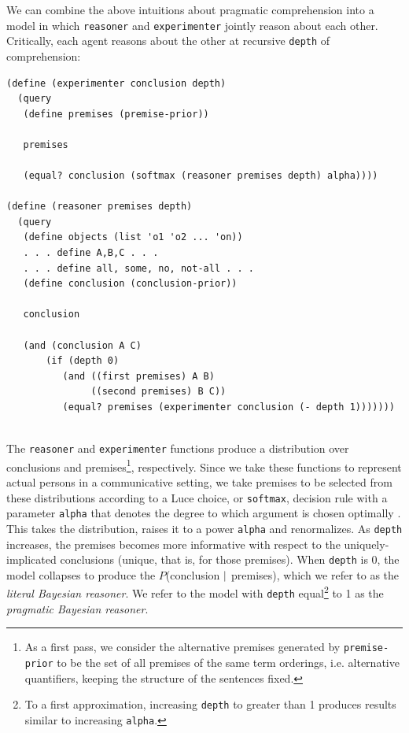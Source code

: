 \documentclass[10pt,letterpaper]{article}
\begin{document}
We can combine the above intuitions about pragmatic comprehension into a model in which \lstinline{reasoner} and \lstinline{experimenter} jointly reason about each other. Critically, each agent reasons about the other at recursive \lstinline{depth} of comprehension:
\begin{lstlisting}
(define (experimenter conclusion depth)
  (query 
   (define premises (premise-prior))
   
   premises
   
   (equal? conclusion (softmax (reasoner premises depth) alpha))))

(define (reasoner premises depth)
  (query 
   (define objects (list 'o1 'o2 ... 'on)) 
   . . . define A,B,C . . . 
   . . . define all, some, no, not-all . . .
   (define conclusion (conclusion-prior))
   
   conclusion
   
   (and (conclusion A C)
	   (if (depth 0)
          (and ((first premises) A B)
               ((second premises) B C))
          (equal? premises (experimenter conclusion (- depth 1)))))))
            
\end{lstlisting}


The \lstinline{reasoner} and \lstinline{experimenter} functions produce a distribution over conclusions and premises\footnote{As a first pass, we consider the alternative premises generated by \lstinline{premise-prior} to be the set of all premises of the same term orderings, i.e. alternative quantifiers, keeping the structure of the sentences fixed.}, respectively. Since we take these functions to represent actual persons in a communicative setting, we take premises to be selected from these distributions according to a Luce choice, or \lstinline{softmax}, decision rule with a parameter \lstinline{alpha} that denotes the degree to which argument is chosen optimally \cite{luce1959}. This takes the distribution, raises it to a power \lstinline{alpha} and renormalizes. As \lstinline{depth} increases, the premises becomes more informative with respect to the uniquely-implicated conclusions (unique, that is, for those premises). When \lstinline{depth} is 0, the model collapses to produce the $P$(conclusion $\arrowvert$ premises), which we refer to as the \emph{literal Bayesian reasoner}. We refer to the model with \lstinline{depth} equal\footnote{To a first approximation, increasing \lstinline{depth} to greater than 1 produces results  similar to increasing \lstinline{alpha}.} to 1 as the \emph{pragmatic Bayesian reasoner}. 
\end{document}
